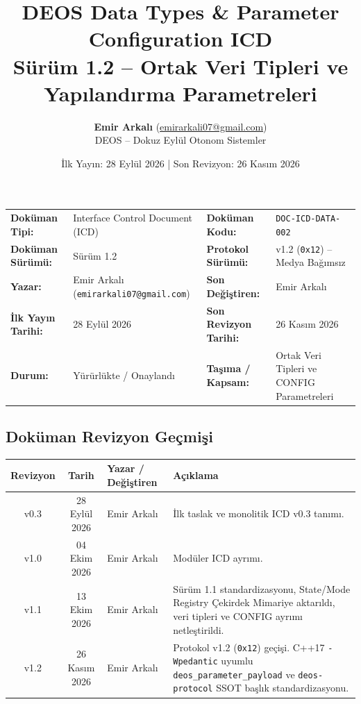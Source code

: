 \documentclass[a4paper,10pt]{article}
\title{\textbf{DEOS Data Types \& Parameter Configuration ICD}\\
\large Sürüm 1.2 -- Ortak Veri Tipleri ve Yapılandırma Parametreleri}
\author{\textbf{Emir Arkalı} (\href{mailto:emirarkali07@gmail.com}{emirarkali07@gmail.com})\\DEOS -- Dokuz Eylül Otonom Sistemler}
\date{İlk Yayın: 28 Eylül 2026 \quad | \quad Son Revizyon: 26 Kasım 2026}
\newcommand{\hex}[1]{\texttt{0x#1}}
\newcommand{\code}[1]{\texttt{#1}}
\begin{document}
\maketitle

\begin{center}
\small
\begin{tabularx}{\textwidth}{ll lX}
\toprule
\textbf{Doküman Tipi:} & Interface Control Document (ICD) & \textbf{Doküman Kodu:} & \code{DOC-ICD-DATA-002} \\
\textbf{Doküman Sürümü:} & Sürüm 1.2 & \textbf{Protokol Sürümü:} & v1.2 (\hex{12}) -- Medya Bağımsız \\
\textbf{Yazar:} & Emir Arkalı (\texttt{emirarkali07@gmail.com}) & \textbf{Son Değiştiren:} & Emir Arkalı \\
\textbf{İlk Yayın Tarihi:} & 28 Eylül 2026 & \textbf{Son Revizyon Tarihi:} & 26 Kasım 2026 \\
\textbf{Durum:} & Yürürlükte / Onaylandı & \textbf{Taşıma / Kapsam:} & Ortak Veri Tipleri ve CONFIG Parametreleri \\
\bottomrule
\end{tabularx}
\end{center}

\subsection*{Doküman Revizyon Geçmişi}
\begin{center}
\small
\begin{tabularx}{\textwidth}{c c l X}
\toprule
\textbf{Revizyon} & \textbf{Tarih} & \textbf{Yazar / Değiştiren} & \textbf{Açıklama} \\
\midrule
v0.3 & 28 Eylül 2026 & Emir Arkalı & İlk taslak ve monolitik ICD v0.3 tanımı. \\
v1.0 & 04 Ekim 2026 & Emir Arkalı & Modüler ICD ayrımı. \\
v1.1 & 13 Ekim 2026 & Emir Arkalı & Sürüm 1.1 standardizasyonu, State/Mode Registry Çekirdek Mimariye aktarıldı, veri tipleri ve CONFIG ayrımı netleştirildi. \\
v1.2 & 26 Kasım 2026 & Emir Arkalı & Protokol v1.2 (\hex{12}) geçişi. C++17 \code{-Wpedantic} uyumlu \code{deos\_parameter\_payload} ve \code{deos-protocol} SSOT başlık standardizasyonu. \\
\bottomrule
\end{tabularx}
\end{center}
\vspace{0.8em}
\end{document}
